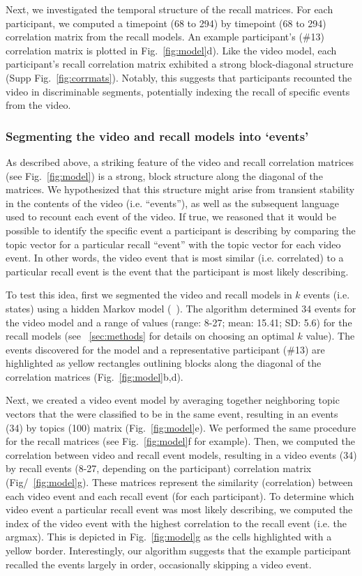 \documentclass{article}
\begin{document}
{Next, we investigated the temporal structure of the recall matrices. For each participant, we computed a timepoint (68 to 294) by timepoint (68 to 294) correlation matrix from the recall models. An example participant's (\#13) correlation matrix is plotted in Fig.~\ref{fig:model}d). Like the video model, each participant's recall correlation matrix exhibited a strong block-diagonal structure (Supp Fig.~\ref{fig:corrmats}). Notably, this suggests that participants recounted the video in discriminable segments, potentially indexing the recall of specific events from the video.

\subsubsection{Segmenting the video and recall models into `events'}
As described above, a striking feature of the video and recall correlation matrices (see Fig.~\ref{fig:model}) is a strong, block structure along the diagonal of the matrices.  We hypothesized that this structure might arise from transient stability in the contents of the video (i.e. ``events''), as well as the subsequent language used to recount each event of the video. If true, we reasoned that it would be possible to identify the specific event a participant is describing by comparing the topic vector for a particular recall ``event'' with the topic vector for each video event. In other words, the video event that is most similar (i.e. correlated) to a particular recall event is the event that the participant is most likely describing.

To test this idea, first we segmented the video and recall models in $k$ events (i.e. states) using a hidden Markov model (~\citep{BaldEtal17}). The algorithm determined 34 events for the video model and a range of values (range: 8-27; mean: 15.41; SD: 5.6) for the recall models (see ~\ref{sec:methods} for details on choosing an optimal $k$ value).  The events discovered for the model and a representative participant (\#13) are highlighted as yellow rectangles outlining blocks along the diagonal of the correlation matrices (Fig.~\ref{fig:model}b,d).

Next, we created a video event model by averaging together neighboring topic vectors that the were classified to be in the same event, resulting in an events (34) by topics (100) matrix (Fig.~\ref{fig:model}e).  We performed the same procedure for the recall matrices (see Fig.~\ref{fig:model}f for example). Then, we computed the correlation between video and recall event models, resulting in a video events (34) by recall events (8-27, depending on the participant) correlation matrix (Fig/~\ref{fig:model}g). These matrices represent the similarity (correlation) between each video event and each recall event (for each participant). To determine which video event a particular recall event was most likely describing, we computed the index of the video event with the highest correlation to the recall event (i.e. the argmax).  This is depicted in Fig.~\ref{fig:model}g as the cells highlighted with a yellow border. Interestingly, our algorithm suggests that the example participant recalled the events largely in order, occasionally skipping a video event.

}
\end{document}
